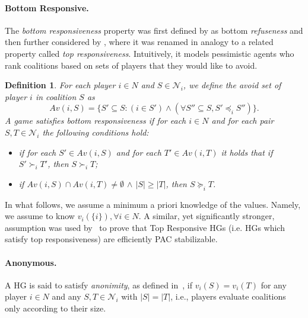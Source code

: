 \documentclass[letterpaper]{article} %
\newtheorem{definition}[theorem]{Definition}
\newcommand{\modulus}[1]{\vert #1 \vert}
\begin{document}
\paragraph{Bottom Responsive.}
The \emph{bottom responsiveness} property was first defined by \citet{suzuki2010hedonic} as bottom \emph{refuseness} and then further considered by \citet{Aziz_BottomResp}, where it was renamed in analogy to a related property called \emph{top responsiveness}. Intuitively, it models pessimistic agents who rank coalitions based on sets of players that they would like to avoid.

\begin{definition}\label{def:bottom_responsive}
For each player $i\in N$ and $S\in \mathcal{N}_i$, we define the \emph{avoid set} of player $i$ in coalition $S$ as
\[
Av(i,S)=\{S'\subseteq S : (i\in S') \land (\forall S''\subseteq S, S'\preceq_i S'') \}.
\]
A game satisfies \emph{bottom responsiveness} if for each $i\in N$ and for each pair $S,T\in \mathcal{N}_i$ the following conditions hold:
\begin{itemize}
    \item[(i)] if for each $S'\in Av(i,S)$ and for each $T'\in Av(i,T)$ it holds that if $S'\succ_i T'$, then $S\succ_i T$;
    \item[(ii)] if $Av(i,S)\cap Av(i,T)\neq \emptyset$ $\land$ $\modulus{S}\geq \modulus{T}$, then $S\succeq_i T$.
\end{itemize}
\end{definition}

In what follows, we assume a minimum a priori knowledge of the values. Namely, we assume to know $v_i(\{i\}), \forall i\in N$. A similar, yet significantly stronger, assumption was used by~\cite{SliwinskiZ17} to prove that Top Responsive HGs (i.e. HGs which satisfy top responsiveness) are efficiently PAC stabilizable.

\paragraph{Anonymous.}
A HG is said to satisfy \emph{anonimity}, as defined in~\cite{Banerjee01, Bogomolnaia02}, if $v_i(S) = v_i(T)$ for any player $i \in N$ and any $S,T\in \mathcal{N}_i$ with $|S|=|T|$, i.e., players evaluate coalitions only according to their size.
\end{document}
